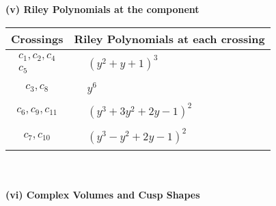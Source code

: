 \documentclass[1p]{elsarticle_modified}
\theoremstyle{definition}
\begin{document}
\newpage\renewcommand{\arraystretch}{1}
\flushleft \textbf{(v) Riley Polynomials at the component}\newline \\
\begin{tabular}{m{50pt}|m{274pt}}
Crossings & \hspace{64pt}Riley Polynomials at each crossing \\
\hline $$\begin{aligned}c_{1},c_{2},c_{4}\\c_{5}\end{aligned}$$&$\begin{aligned}
&(y^2+y+1)^3
\end{aligned}$\\
\hline $$\begin{aligned}c_{3},c_{8}\end{aligned}$$&$\begin{aligned}
&y^6
\end{aligned}$\\
\hline $$\begin{aligned}c_{6},c_{9},c_{11}\end{aligned}$$&$\begin{aligned}
&(y^3+3 y^2+2 y-1)^2
\end{aligned}$\\
\hline $$\begin{aligned}c_{7},c_{10}\end{aligned}$$&$\begin{aligned}
&(y^3- y^2+2 y-1)^2
\end{aligned}$\\
\hline
\end{tabular}\\~\\
\newpage\flushleft \textbf{(vi) Complex Volumes and Cusp Shapes}
\end{document}
